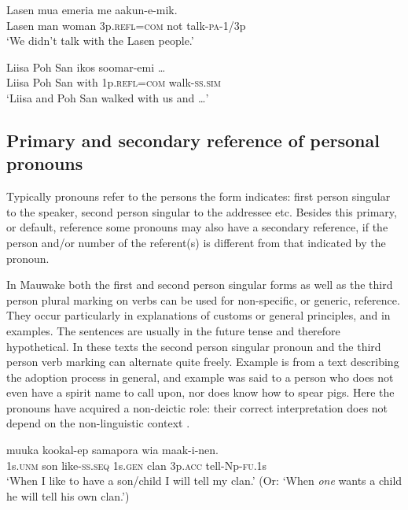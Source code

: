 \ea%
\label{ex:3:x619}
\gll Lasen mua emeria  me aakun-e-mik. \\
Lasen man woman 3p.\textsc{refl}=\textsc{com} not talk-\textsc{pa}-1/3p\\
\glt`We didn't talk with the Lasen people.'
\z

\ea%
\label{ex:3:x620}
\gll Liisa Poh San ikos  soomar-emi {\dots} \\
Liisa Poh San with 1p.\textsc{refl}=\textsc{com} walk-\textsc{ss}.\textsc{sim}\\
\glt`Liisa and Poh San walked with us and {\dots}'
\z

\subsection{Primary and secondary reference of personal pronouns}\label{sec:3:y:x}
{}
Typically pronouns refer to the persons the form indicates: first person singular to the speaker, second person singular to the addressee etc. Besides this primary, or default, reference some pronouns may also have a secondary reference, if the person and/or number of the referent(s) is different from that indicated by the pronoun.

In Mauwake both the first and second person singular forms as well as the third person plural marking on verbs can be used for non-specific, or generic, reference. They occur particularly in explanations of customs or general principles, and in examples. The sentences are usually in the future tense and therefore hypothetical. In these texts the second person singular pronoun and the third person verb marking can alternate quite freely. Example  is from a text describing the adoption process in general, and example  was said to a person who does not even have a spirit name to call upon, nor does know how to spear pigs. Here the pronouns have acquired a non-deictic role: their correct interpretation does not depend on the non-linguistic context \citep[260]{AndersonEtAl1985}%
.

\ea%
\label{ex:3:x621}
\gll {} muuka kookal-ep  samapora wia maak-i-nen.\\
1s.\textsc{unm} son like-\textsc{ss}.\textsc{seq} 1s.\textsc{gen} clan 3p.\textsc{acc} tell-Np-\textsc{fu}.1s\\
\glt`When I like to have a son/child I will tell my clan.' (Or: `When \textit{one} wants a child he will tell his own clan.')
\z

